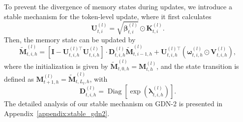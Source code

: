 To prevent the divergence of memory states during updates, we introduce a stable mechanism for the token-level update, where it first calculates
\begin{equation*}
    \mathbf{U}_{t,i}^{(l)} = \sqrt{\bm{\beta}_{t,i}^{(l)}}
\odot
\mathbf{K}_{t,i}^{(l)}.
\end{equation*}
Then, the memory state can be updated by
\begin{equation*}
    \tilde{\mathbf{M}}_{t, i, h}^{(l)} = \left[
\mathbf{I}
-
\mathbf{U}_{t,i,h}^{(l)\top}
\mathbf{U}_{t,i,h}^{(l)}
\right]
\cdot
\mathbf{D}_{t,i,h}^{(l)}
\tilde{\mathbf{M}}_{t,i-1,h}^{(l)}
+
\mathbf{U}_{t,i,h}^{(l)\top}
\left(
\bm{\omega}_{t,i,h}^{(l)}
\odot
\mathbf{V}_{t,i,h}^{(l)}
\right),
\end{equation*}
where the initialization is given by $\tilde{\mathbf{M}}_{t, 0, h}^{(l)} = \mathbf{M}_{t,  h}^{(l)}$, and the state transition is defined as $\mathbf{M}_{t+1,  h}^{(l)} = \tilde{\mathbf{M}}_{t, L_t, h}^{(l)}$, with
\begin{equation*}
    \mathbf{D}_{t,i,h}^{(l)} = \operatorname{Diag}
\left[
\exp
\left(
\bm{\lambda}_{t,i,h}^{(l)}
\right)
\right].
\end{equation*}
The detailed analysis of our stable mechanism on GDN-2 is presented in Appendix~\ref{appendix:stable_gdn2}.

